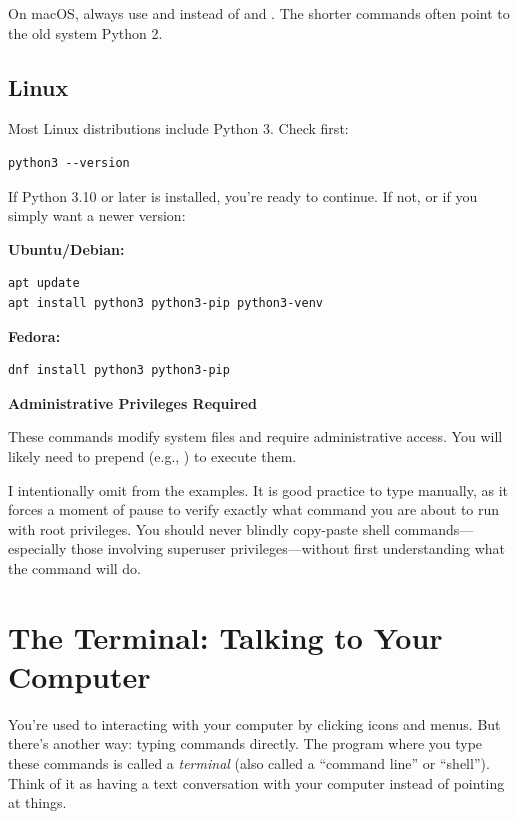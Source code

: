 \begin{note}
On macOS, always use  and  instead of  and . The shorter commands often point to the old system Python 2.
\end{note}

\subsection{Linux}

Most Linux distributions include Python 3. Check first:

\begin{lstlisting}[style=shellstyle]
python3 --version
\end{lstlisting}

If Python 3.10 or later is installed, you're ready to continue. If not, or if you simply want a newer version:

\textbf{Ubuntu/Debian:}
\begin{lstlisting}[style=shellstyle]
apt update
apt install python3 python3-pip python3-venv
\end{lstlisting}

\textbf{Fedora:}
\begin{lstlisting}[style=shellstyle]
dnf install python3 python3-pip
\end{lstlisting}

\begin{note}
\textbf{Administrative Privileges Required}

These commands modify system files and require administrative access. You will likely need to prepend  (e.g., ) to execute them.

I intentionally omit  from the examples. It is good practice to type  manually, as it forces a moment of pause to verify exactly what command you are about to run with root privileges. You should never blindly copy-paste shell commands---especially those involving superuser privileges---without first understanding what the command will do.
\end{note}

\section{The Terminal: Talking to Your Computer}
\label{sec:launcher}

You're used to interacting with your computer by clicking icons and menus. But there's another way: typing commands directly. The program where you type these commands is called a \emph{terminal} (also called a ``command line'' or ``shell''). Think of it as having a text conversation with your computer instead of pointing at things.

